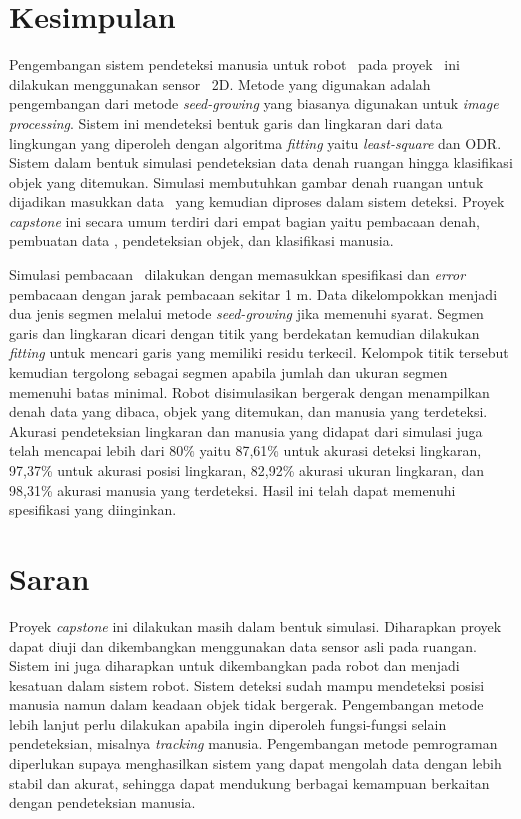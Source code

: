 
\section{Kesimpulan}
\label{sec:kesimpulan}

Pengembangan sistem pendeteksi manusia untuk robot \covid\ pada proyek \capstone\ ini dilakukan menggunakan sensor \lidar\ 2D. Metode yang digunakan adalah pengembangan dari metode \textit{seed-growing} yang biasanya digunakan untuk \textit{image processing}. Sistem ini mendeteksi bentuk garis dan lingkaran dari data lingkungan yang diperoleh dengan algoritma \textit{fitting} yaitu \textit{least-square} dan ODR. Sistem dalam bentuk simulasi pendeteksian data denah ruangan hingga klasifikasi objek yang ditemukan. Simulasi membutuhkan gambar denah ruangan untuk dijadikan masukkan data \lidar\ yang kemudian diproses dalam sistem deteksi. Proyek \textit{capstone} ini secara umum terdiri dari empat bagian yaitu pembacaan denah, pembuatan data \lidar, pendeteksian objek, dan klasifikasi manusia. 
    
Simulasi pembacaan \lidar\ dilakukan dengan memasukkan spesifikasi dan \textit{error} pembacaan dengan jarak pembacaan sekitar 1 m. Data dikelompokkan menjadi dua jenis segmen melalui metode \textit{seed-growing} jika memenuhi syarat. Segmen garis dan lingkaran dicari dengan titik yang berdekatan kemudian dilakukan \textit{fitting} untuk mencari garis yang memiliki residu terkecil. Kelompok titik tersebut kemudian tergolong sebagai segmen apabila jumlah dan ukuran segmen memenuhi batas minimal. Robot disimulasikan bergerak dengan menampilkan denah data yang dibaca, objek yang ditemukan, dan manusia yang terdeteksi. Akurasi pendeteksian lingkaran dan manusia yang didapat dari simulasi juga telah mencapai lebih dari $80\%$ yaitu 87,61\% untuk akurasi deteksi lingkaran, 97,37\% untuk akurasi posisi lingkaran, 82,92\% akurasi ukuran lingkaran, dan 98,31\% akurasi manusia yang terdeteksi. Hasil ini telah dapat memenuhi spesifikasi yang diinginkan.

\section{Saran}
\label{sec:saran}

Proyek \textit{capstone} ini dilakukan masih dalam bentuk simulasi. Diharapkan proyek dapat diuji dan dikembangkan menggunakan data sensor asli pada ruangan. Sistem ini juga diharapkan untuk dikembangkan pada robot dan menjadi kesatuan dalam sistem robot. Sistem deteksi sudah mampu mendeteksi posisi manusia namun dalam keadaan objek tidak bergerak. Pengembangan metode lebih lanjut perlu dilakukan apabila ingin diperoleh fungsi-fungsi selain pendeteksian, misalnya \textit{tracking} manusia. Pengembangan metode pemrograman diperlukan supaya menghasilkan sistem yang dapat mengolah data dengan lebih stabil dan akurat, sehingga dapat mendukung berbagai kemampuan berkaitan dengan pendeteksian manusia. 